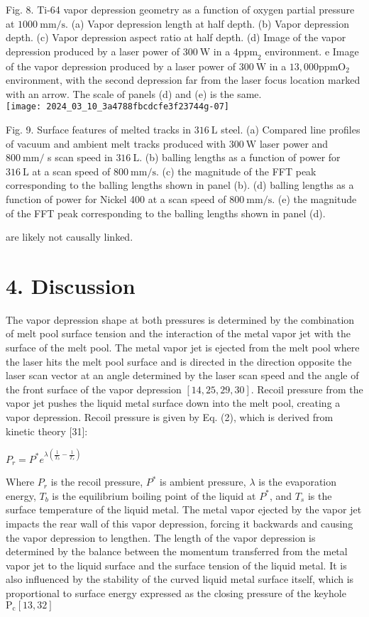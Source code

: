 \documentclass[10pt]{article}
\begin{document}
Fig. 8. Ti-64 vapor depression geometry as a function of oxygen partial pressure at $1000 \mathrm{~mm} / \mathrm{s}$. (a) Vapor depression length at half depth. (b) Vapor depression depth. (c) Vapor depression aspect ratio at half depth. (d) Image of the vapor depression produced by a laser power of $300 \mathrm{~W}$ in a $4 \mathrm{ppm}_{2}$ environment. e Image of the vapor depression produced by a laser power of $300 \mathrm{~W}$ in a $13,000 \mathrm{ppm} \mathrm{O}_{2}$ environment, with the second depression far from the laser focus location marked with an arrow. The scale of panels (d) and (e) is the same.\\
\texttt{[image: 2024\_03\_10\_3a4788fbcdcfe3f23744g-07]}

Fig. 9. Surface features of melted tracks in $316 \mathrm{~L}$ steel. (a) Compared line profiles of vacuum and ambient melt tracks produced with $300 \mathrm{~W}$ laser power and $800 \mathrm{~mm} /$ s scan speed in $316 \mathrm{~L}$. (b) balling lengths as a function of power for $316 \mathrm{~L}$ at a scan speed of $800 \mathrm{~mm} / \mathrm{s}$. (c) the magnitude of the FFT peak corresponding to the balling lengths shown in panel (b). (d) balling lengths as a function of power for Nickel 400 at a scan speed of $800 \mathrm{~mm} / \mathrm{s}$. (e) the magnitude of the FFT peak corresponding to the balling lengths shown in panel (d).

are likely not causally linked.

\section*{4. Discussion}
The vapor depression shape at both pressures is determined by the combination of melt pool surface tension and the interaction of the metal vapor jet with the surface of the melt pool. The metal vapor jet is ejected from the melt pool where the laser hits the melt pool surface and is directed in the direction opposite the laser scan vector at an angle determined by the laser scan speed and the angle of the front surface of the vapor depression $[14,25,29,30]$. Recoil pressure from the vapor jet pushes the liquid metal surface down into the melt pool, creating a vapor depression. Recoil pressure is given by Eq. (2), which is derived from kinetic theory [31]:

$P_{r}=P^{*} e^{\lambda\left(\frac{1}{T_{b}}-\frac{1}{T_{s}}\right)}$

Where $P_{r}$ is the recoil pressure, $P^{*}$ is ambient pressure, $\lambda$ is the evaporation energy, $T_{b}$ is the equilibrium boiling point of the liquid at $P^{*}$, and $T_{s}$ is the surface temperature of the liquid metal. The metal vapor ejected by the vapor jet impacts the rear wall of this vapor depression, forcing it backwards and causing the vapor depression to lengthen. The length of the vapor depression is determined by the balance between the momentum transferred from the metal vapor jet to the liquid surface and the surface tension of the liquid metal. It is also influenced by the stability of the curved liquid metal surface itself, which is proportional to surface energy expressed as the closing pressure of the keyhole $\mathrm{P}_{\mathrm{c}}[13,32]$
\end{document}
